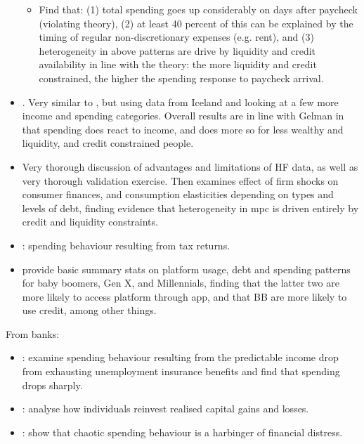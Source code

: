 \documentclass[a4paper, 11pt]{report}
\begin{document}
\begin{itemize}
\begin{itemize}
		\item Find that: (1) total spending goes up considerably on days after paycheck (violating theory), (2) at least 40 percent of this can be explained by the timing of regular non-discretionary expenses (e.g. rent), and (3) heterogeneity in above patterns are drive by liquidity and credit availability in line with the theory: the more liquidity and credit constrained, the higher the spending response to paycheck arrival.
	\end{itemize}

	\item \citet{olafsson2018liquid}. Very similar to \citet{gelman2014harnessing}, but using data from Iceland and looking at a few more income and spending categories. Overall results are in line with Gelman in that spending does react to income, and does more so for less wealthy and liquidity, and credit constrained people.

	\item \citet{baker2018debt} Very thorough discussion of advantages and limitations of HF data, as well as very thorough validation exercise. Then examines effect of firm shocks on consumer finances, and consumption elasticities depending on types and levels of debt, finding evidence that heterogeneity in mpc is driven entirely by credit and liquidity constraints.

	\item \citet{baugh2014disentangling}: spending behaviour resulting from tax returns.

	\item \citet{carlin2019generational} provide basic summary stats on platform usage, debt and spending patterns for baby boomers, Gen X, and Millennials, finding that the latter two are more likely to access platform through app, and that BB are more likely to use credit, among other things.
\end{itemize}

From banks:
\begin{itemize}
	\item \citet{ganong2019consumer}: examine spending behaviour resulting from the predictable income drop from exhausting unemployment insurance benefits and find that spending drops sharply.

	\item \citet{meyer2018fully}: analyse how individuals reinvest realised capital gains and losses.

	\item \citet{muggleton2020evidence}: show that chaotic spending behaviour is a harbinger of financial distress.


\end{itemize}
\end{document}
